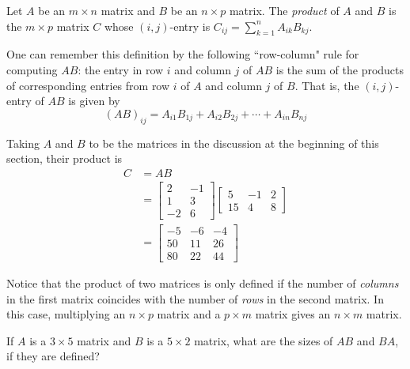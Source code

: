 \documentclass[12pt,letterpaper,reqno]{article}
\numberwithin{equation}{section}
\newcommand{\ti}[1]{\textit{#1}}
\begin{document}
\begin{defn}\label{def:matrix_multiplication}
	Let $A$ be an $m \times n$ matrix and $B$ be an $n \times p$ matrix. The \ti{product} of $A$ and $B$ is the $m \times p$ matrix $C$ whose $(i,j)$-entry is $C_{ij}=\sum_{k=1}^n A_{ik}B_{kj}$.
\end{defn}

\begin{example}
	One can remember this definition by the following ``row-column" rule for computing $AB$: the entry in row $i$ and column $j$ of $AB$ is the sum of the products of corresponding entries from row $i$ of $A$ and column $j$ of $B$. That is, the $(i,j)$-entry of $AB$ is given by
\begin{equation}
	(AB)_{ij}=A_{i1}B_{1j}+A_{i2}B_{2j}+\cdots+A_{in}B_{nj}	
\end{equation}

\end{example}



\begin{example}
Taking $A$ and $B$ to be the matrices in the discussion at the beginning of this section, their product is  
\begin{align*}
	C&=AB \\
	&=\begin{bmatrix}
			2&-1\\1&3\\-2&6
		\end{bmatrix}\begin{bmatrix}
		5&-1&2 \\ 15&4&8
	\end{bmatrix} \\
	&=\begin{bmatrix}
		-5&-6&-4 \\
		50&11&26 \\
		80&22&44
	\end{bmatrix}
\end{align*}
\end{example}

Notice that the product of two matrices is only defined if the number of \ti{columns} in the first matrix coincides with the number of \ti{rows} in the second matrix. In this case, multiplying an $n \times p$ matrix and a $p \times m$ matrix gives an $n \times m$ matrix.

\begin{exercise}
	If $A$ is a $3 \times 5$ matrix and $B$ is a $5 \times 2$ matrix, what are the sizes of $AB$ and $BA$, if they are defined?	
\end{exercise}
\end{document}
